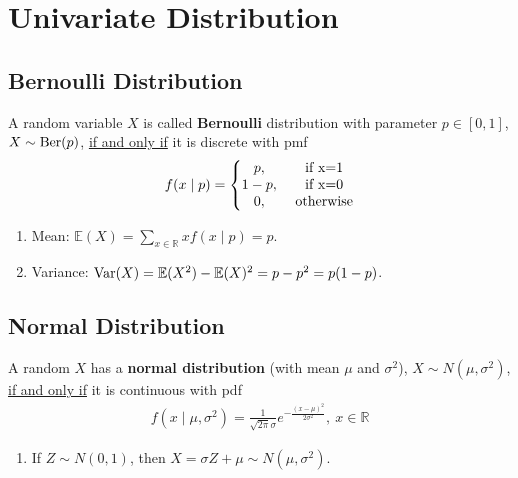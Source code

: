 \documentclass[11pt]{elegantbook}
\begin{document}
\section{Univariate Distribution}
\subsection{Bernoulli Distribution}
\begin{definition}
    \normalfont
    A random variable $X$ is called \textbf{Bernoulli} distribution with parameter $p\in[0,1]$, $X\sim \textnormal{Ber}(p)$, \underline{if and only if} it is discrete with pmf
    \begin{equation}
        \begin{aligned}
            f(x\mid p)=\left\{\begin{matrix}
                p,&\textnormal{ if x=1}\\
                1-p,&\textnormal{ if x=0}\\
                0,&\textnormal{ otherwise}
            \end{matrix}\right.
        \end{aligned}
        \nonumber
    \end{equation}
\end{definition}
\begin{enumerate}[$\circ$]
    \item Mean: $\mathbb{E}(X)=\sum_{x\in \mathbb{R}}x f(x\mid p)=p$.
    \item Variance: $\textnormal{Var}(X)=\mathbb{E}(X^2)-\mathbb{E}(X)^2=p-p^2=p(1-p)$.
\end{enumerate}

\subsection{Normal Distribution}
\begin{definition}
    \normalfont
    A random $X$ has a \textbf{normal distribution} (with mean $\mu$ and $\sigma^2$), $X\sim N(\mu,\sigma^2)$, \underline{if and only if} it is continuous with pdf
    \begin{equation}
        \begin{aligned}
            f(x\mid \mu,\sigma^2)=\frac{1}{\sqrt{2\pi}\sigma}e^{-\frac{(x-\mu)^2}{2\sigma^2}},\ x\in \mathbb{R}
        \end{aligned}
        \nonumber
    \end{equation}
\end{definition}
\begin{enumerate}[$\circ$]
    \item If $Z\sim N(0,1)$, then $X=\sigma Z+\mu \sim N(\mu,\sigma^2)$.
\end{enumerate}
\end{document}
